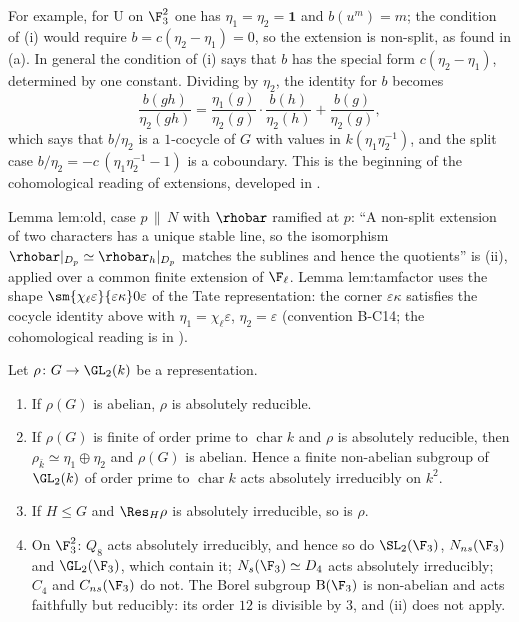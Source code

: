 For example, for $\mathrm U$ on $\F_3^2$ one has $\eta_1=\eta_2=\mathbf1$ and $b(u^m)=m$; the condition of (i) would require $b=c(\eta_2-\eta_1)=0$, so the
extension is non-split, as found in (a). In general the condition of (i) says that $b$ has the special
form $c(\eta_2-\eta_1)$, determined by one constant. Dividing by $\eta_2$, the identity for $b$ becomes
\[
\frac{b(gh)}{\eta_2(gh)}=\frac{\eta_1(g)}{\eta_2(g)}\cdot\frac{b(h)}{\eta_2(h)}+\frac{b(g)}{\eta_2(g)},
\]
which says that $b/\eta_2$ is a $1$-cocycle of $G$ with values in $k(\eta_1\eta_2^{-1})$, and the split case $b/\eta_2=-c\,(\eta_1\eta_2^{-1}-1)$ is a
coboundary. This is the beginning of the cohomological reading of extensions, developed in .

\begin{paperlink}
Lemma lem:old, case $p\,\|\,N$ with $\rhobar$ ramified at $p$: ``A non-split extension of two characters has a unique stable line, so the
isomorphism $\rhobar|_{D_p}\simeq\rhobar_h|_{D_p}$ matches the sublines and hence the quotients'' is (ii), applied over a common finite extension
of $\F_\ell$. Lemma lem:tamfactor uses the shape $\sm{\chi_\ell\varepsilon}{\varepsilon\kappa}0\varepsilon$ of the Tate representation: the corner
$\varepsilon\kappa$ satisfies the cocycle identity above with $\eta_1=\chi_\ell\varepsilon$, $\eta_2=\varepsilon$ (convention B-C14; the cohomological reading is in
).
\end{paperlink}

\begin{proposition}\label{prop:reps:dim2-absirr}
Let $\rho\colon G\to\GL_2(k)$ be a representation.
\begin{enumerate}[label=(\roman*)]
\item If $\rho(G)$ is abelian, $\rho$ is absolutely reducible.
\item If $\rho(G)$ is finite of order prime to $\operatorname{char}k$ and $\rho$ is absolutely reducible, then $\rho_{\bar k}\simeq\eta_1\oplus\eta_2$ and $\rho(G)$
is abelian. Hence a finite non-abelian subgroup of $\GL_2(k)$ of order prime to $\operatorname{char}k$ acts absolutely irreducibly on $k^2$.
\item If $H\le G$ and $\Res_H\rho$ is absolutely irreducible, so is $\rho$.
\item On $\F_3^2$: $Q_8$ acts absolutely irreducibly, and hence so do $\SL_2(\F_3)$, $N_{ns}(\F_3)$ and $\GL_2(\F_3)$, which contain it; $N_s(\F_3)\simeq D_4$
acts absolutely irreducibly; $C_4$ and $C_{ns}(\F_3)$ do not. The Borel subgroup $\mathrm B(\F_3)$ is non-abelian and acts faithfully but
reducibly: its order $12$ is divisible by $3$, and (ii) does not apply.
\end{enumerate}
\end{proposition}

